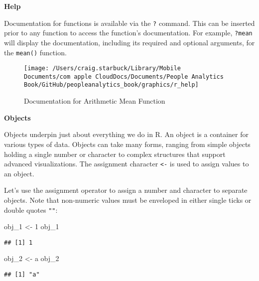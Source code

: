 \documentclass[
]{book}
\newenvironment{Shaded}{\begin{snugshade}}{\end{snugshade}}
\newcommand{\DecValTok}[1]{\textcolor[rgb]{0.00,0.00,0.81}{#1}}
\newcommand{\NormalTok}[1]{#1}
\newcommand{\OtherTok}[1]{\textcolor[rgb]{0.56,0.35,0.01}{#1}}
\newcommand{\StringTok}[1]{\textcolor[rgb]{0.31,0.60,0.02}{#1}}
\begin{document}
\textbf{Help}

Documentation for functions is available via the \texttt{?} command. This can be inserted prior to any function to access the function's documentation. For example, \texttt{?mean} will display the documentation, including its required and optional arguments, for the \texttt{mean()} function.

\begin{figure}

{\centering \texttt{[image: /Users/craig.starbuck/Library/Mobile Documents/com~apple~CloudDocs/Documents/People Analytics Book/GitHub/peopleanalytics\_book/graphics/r\_help]} 

}

\caption{Documentation for Arithmetic Mean Function}\label{fig:r-help}
\end{figure}

\textbf{Objects}

Objects underpin just about everything we do in R. An object is a container for various types of data. Objects can take many forms, ranging from simple objects holding a single number or character to complex structures that support advanced visualizations. The assignment character \texttt{\textless{}-} is used to assign values to an object.

Let's use the assignment operator to assign a number and character to separate objects. Note that non-numeric values must be enveloped in either single ticks \texttt{\textquotesingle{}\textquotesingle{}} or double quotes \texttt{""}:

\begin{Shaded}
\begin{Highlighting}[]
\NormalTok{obj\_1 }\OtherTok{\textless{}{-}} \DecValTok{1}
\NormalTok{obj\_1}
\end{Highlighting}
\end{Shaded}

\begin{verbatim}
## [1] 1
\end{verbatim}

\begin{Shaded}
\begin{Highlighting}[]
\NormalTok{obj\_2 }\OtherTok{\textless{}{-}} \StringTok{\textquotesingle{}a\textquotesingle{}}
\NormalTok{obj\_2}
\end{Highlighting}
\end{Shaded}

\begin{verbatim}
## [1] "a"
\end{verbatim}
\end{document}
